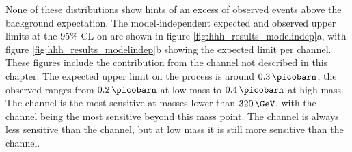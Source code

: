 None of these distributions show hints of an excess of observed events above the background expectation. 
The model-independent expected and observed upper limits at the 95\% \ac{CL}
on \xsbr are shown in 
figure \ref{fig:hhh_results_modelindep}a, with figure \ref{fig:hhh_results_modelindep}b 
showing the expected limit per channel. These figures include the contribution from the 
\tautau channel not described in this chapter. The expected upper limit
on the \Htohhtobbtautau process is around $0.3\,\picobarn$, the observed ranges
from $0.2\,\picobarn$ at low mass to $0.4\,\picobarn$ at high mass. 
The \mutau channel is the most sensitive at masses lower than $320\,\GeV$, with 
the \tautau channel being the most sensitive beyond this mass point. The \etau channel is always
less sensitive than the \mutau channel, but at low mass it is still more sensitive than the \tautau 
channel.

